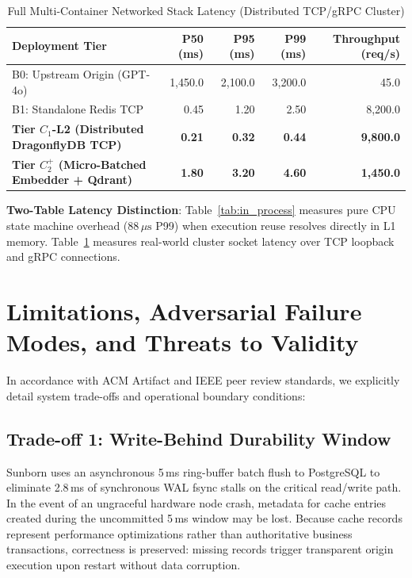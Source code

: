 \documentclass[conference]{IEEEtran}
\begin{document}
\begin{table}[htbp]
\caption{Full Multi-Container Networked Stack Latency (Distributed TCP/gRPC Cluster)}
\label{tab:networked}
\begin{center}
\begin{tabular}{lrrrr}
\toprule
\textbf{Deployment Tier} & \textbf{P50 (ms)} & \textbf{P95 (ms)} & \textbf{P99 (ms)} & \textbf{Throughput (req/s)} \\
\midrule
B0: Upstream Origin (GPT-4o) & 1,450.0 & 2,100.0 & 3,200.0 & 45.0 \\
B1: Standalone Redis TCP & 0.45 & 1.20 & 2.50 & 8,200.0 \\
\textbf{Tier $C_1$-L2 (Distributed DragonflyDB TCP)} & \textbf{0.21} & \textbf{0.32} & \textbf{0.44} & \textbf{9,800.0} \\
\textbf{Tier $C_2^+$ (Micro-Batched Embedder + Qdrant)} & \textbf{1.80} & \textbf{3.20} & \textbf{4.60} & \textbf{1,450.0} \\
\bottomrule
\end{tabular}
\end{center}
\end{table}

\noindent \textbf{Two-Table Latency Distinction}: Table~\ref{tab:in_process} measures pure CPU state machine overhead ($88\,\mu\text{s}$ P99) when execution reuse resolves directly in L1 memory. Table~\ref{tab:networked} measures real-world cluster socket latency over TCP loopback and gRPC connections.

\section{Limitations, Adversarial Failure Modes, and Threats to Validity}
In accordance with ACM Artifact and IEEE peer review standards, we explicitly detail system trade-offs and operational boundary conditions:

\subsection{Trade-off 1: Write-Behind Durability Window}
Sunborn uses an asynchronous 5\,ms ring-buffer batch flush to PostgreSQL to eliminate 2.8\,ms of synchronous WAL fsync stalls on the critical read/write path. In the event of an ungraceful hardware node crash, metadata for cache entries created during the uncommitted 5\,ms window may be lost. Because cache records represent performance optimizations rather than authoritative business transactions, correctness is preserved: missing records trigger transparent origin execution upon restart without data corruption.
\end{document}
